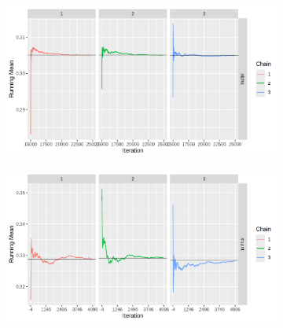 \documentclass[12pt]{article}
\begin{document}
\begin{figure}[h!]
    \centering
    \begin{subfigure}{0.45\textwidth}
        \includegraphics[width=\linewidth]{pictures/centered/centrmeanalpha.png}
    \end{subfigure}
    \begin{subfigure}{0.45\textwidth}
        \includegraphics[width=\linewidth]{pictures/mod2/mod2rmean_muint.png}
    \end{subfigure}


\end{figure}
\end{document}
